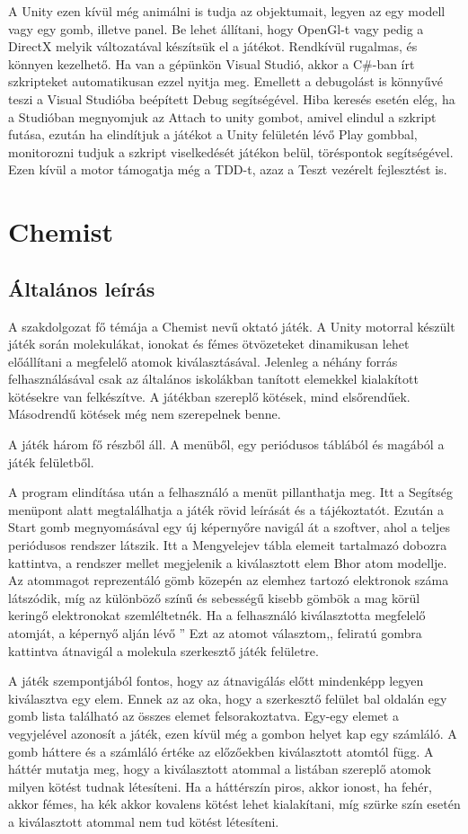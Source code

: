 \documentclass[colorlinks]{thesis-ekf}
\theoremstyle{definition}
\theoremstyle{remark}
\begin{document}
A Unity ezen kívül még animálni is tudja az objektumait, legyen az egy modell vagy egy gomb, illetve panel. Be lehet állítani, hogy OpenGl-t vagy pedig a DirectX melyik változatával készítsük el a játékot. Rendkívül rugalmas, és könnyen kezelhető. Ha van a gépünkön Visual Studió, akkor a C\#-ban írt szkripteket automatikusan ezzel nyitja meg. Emellett a debugolást is könnyűvé teszi a Visual Studióba beépített Debug segítségével. Hiba keresés esetén elég, ha a Studióban megnyomjuk az Attach to unity gombot, amivel elindul a szkript futása, ezután ha elindítjuk a játékot a Unity felületén lévő Play gombbal, monitorozni tudjuk a szkript viselkedését játékon belül, töréspontok segítségével. Ezen kívül a motor támogatja még a TDD-t, azaz a Teszt vezérelt fejlesztést is.
\chapter{Chemist}
\section{Általános leírás}
A szakdolgozat fő témája a Chemist nevű oktató játék. A Unity motorral készült játék során molekulákat, ionokat és fémes ötvözeteket dinamikusan lehet előállítani a megfelelő atomok kiválasztásával. Jelenleg a néhány forrás felhasználásával csak az általános iskolákban tanított elemekkel kialakított kötésekre van felkészítve. A játékban szereplő kötések, mind elsőrendűek. Másodrendű kötések még nem szerepelnek benne.

A játék három fő részből áll. A menüből, egy periódusos táblából és magából a játék felületből. 

A program elindítása után a felhasználó a menüt pillanthatja meg. Itt a Segítség menüpont alatt megtalálhatja a játék rövid leírását és a tájékoztatót. Ezután a Start gomb megnyomásával egy új képernyőre navigál át a szoftver, ahol a teljes periódusos rendszer látszik. Itt a Mengyelejev tábla elemeit tartalmazó dobozra kattintva, a rendszer mellet megjelenik a kiválasztott elem Bhor atom modellje. Az atommagot reprezentáló gömb közepén az elemhez tartozó elektronok száma látszódik, míg az különböző színű és sebességű kisebb gömbök a mag körül keringő elektronokat szemléltetnék. Ha a felhasználó kiválasztotta megfelelő atomját, a képernyő alján lévő '' Ezt az atomot választom,, feliratú gombra kattintva átnavigál a molekula szerkesztő játék felületre.

A játék szempontjából fontos, hogy az átnavigálás előtt mindenképp legyen kiválasztva egy elem. Ennek az az oka, hogy a szerkesztő felület bal oldalán egy gomb lista található az összes elemet felsorakoztatva. Egy-egy elemet a vegyjelével azonosít a játék, ezen kívül még a gombon helyet kap egy számláló. A gomb háttere és a számláló értéke az előzőekben kiválasztott atomtól függ. A háttér mutatja meg, hogy a kiválasztott atommal a listában szereplő atomok milyen kötést tudnak létesíteni. Ha a háttérszín piros, akkor ionost, ha fehér, akkor fémes, ha kék akkor kovalens kötést lehet kialakítani, míg szürke szín esetén a kiválasztott atommal nem tud kötést létesíteni.
\end{document}
